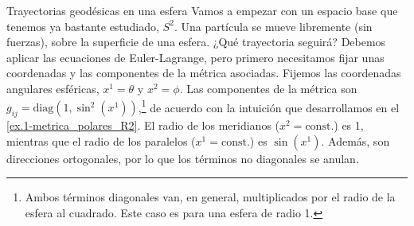 \begin{example}
    {Trayectorias geodésicas en una esfera}
    \label{ex.1-geodesica-esfera}
    Vamos a empezar con un espacio base que tenemos ya bastante estudiado, \(S^2\). Una partícula se mueve libremente (sin fuerzas), sobre la superficie de una esfera. ¿Qué trayectoria seguirá? Debemos aplicar las ecuaciones de Euler-Lagrange, pero primero necesitamos fijar unas coordenadas y las componentes de la métrica asociadas. Fijemos las coordenadas angulares esféricas, \(x^1 = \theta\) y \(x^2 = \phi\). Las componentes de la métrica son \(g_{ij} = \mathrm{diag}\left(1, \sin^2\left(x^1\right)\right)\),\footnote{Ambos términos diagonales van, en general, multiplicados por el radio de la esfera al cuadrado. Este caso es para una esfera de radio 1.} de acuerdo con la intuición que desarrollamos en el \cref{ex.1-metrica_polares_R2}. El radio de los meridianos (\(x^2=\mathrm{const.}\)) es 1, mientras que el radio de los paralelos (\(x^1 = \mathrm{const}.\)) es \(\sin(x^1)\). Además, son direcciones ortogonales, por lo que los términos no diagonales se anulan. 


\end{example}
